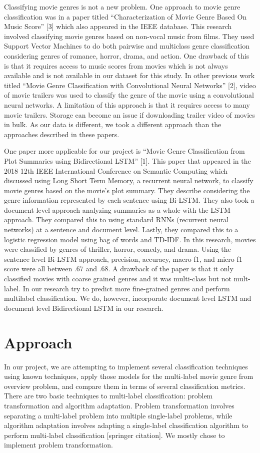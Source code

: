 \documentclass[sigconf]{acmart}
\begin{document}
Classifying movie genres is not a new problem. One approach to movie genre classification was in a paper titled ``Characterization of Movie Genre Based On Music Score'' [3] which also appeared in the IEEE database.  This research involved classifying movie genres based on non-vocal music from films.  They used Support Vector Machines to do both pairwise and multiclass genre classification considering genres of romance, horror, drama, and action.  One drawback of this is that it requires access to music scores from movies which is not always available and is not available in our dataset for this study.  In other previous work titled ``Movie Genre Classification with Convolutional Neural Networks'' [2], video of movie trailers was used to classify the genre of the movie using a convolutional neural networks. A limitation of this approach is that it requires access to many movie trailers.  Storage can become an issue if downloading trailer video of movies in bulk. As our data is different, we took a different approach than the approaches described in these papers. 

One paper more applicable for our project is ``Movie Genre Classification from Plot Summaries using Bidirectional LSTM'' [1]. This paper that appeared in the 2018 12th IEEE International Conference on Semantic Computing which discussed using Long Short Term Memory, a recurrent neural network, to classify movie genres based on the movie's plot summary.  They describe considering the genre information represented by each sentence using Bi-LSTM. They also took a document level approach analyzing summaries as a whole with the LSTM approach.  They compared this to using standard RNNs (recurrent neural networks) at a sentence and document level.  Lastly, they compared this to a logistic regression model using bag of words and TD-IDF. In this research, movies were classified by genres of thriller, horror, comedy, and drama. Using the sentence level Bi-LSTM approach, precision, accuracy, macro f1, and micro f1 score were all between .67 and .68. A drawback of the paper is that it only classified movies with coarse grained genres and it was multi-class but not mult-label.  In our research try to predict more fine-grained genres and perform multilabel classification.  We do, however, incorporate document level LSTM and document level Bidirectional LSTM in our research.


\section{Approach}
In our project, we are attempting to implement several classification techniques using known techniques, apply those models for the multi-label movie genre from overview problem, and compare them in terms of several classification metrics. There are two basic techniques to multi-label classification: problem transformation and algorithm adaptation. Problem transformation involves separating a multi-label problem into multiple single-label problems, while algorithm adaptation involves adapting a single-label classification algorithm to perform multi-label classification [springer citation]. We mostly chose to implement problem transformation.
\end{document}
